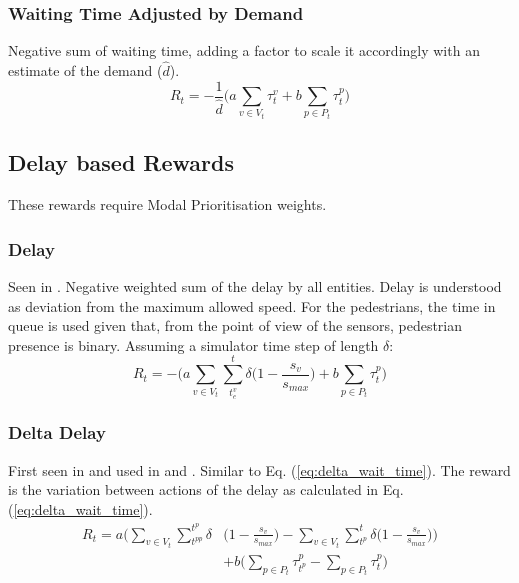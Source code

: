 \documentclass[sigconf,anonymous]{aamas}
\begin{document}
\subsubsection{Waiting Time Adjusted by Demand}
Negative sum of waiting time, adding a factor to scale it accordingly with an estimate of the demand ($\hat{d}$).
\begin{equation}
   R_t = -\frac{1}{\hat{d}} \bigg( a \sum_{v \in V_t} \tau^v_{t} + b \sum_{p \in P_t} \tau^p_{t} \bigg)
\label{eq:wait_time_norm} 
\end{equation}

\subsection{Delay based Rewards}
These rewards require Modal Prioritisation weights.
\subsubsection{Delay}
Seen in \cite{wan2018}. Negative weighted sum of the delay by all entities. Delay is understood as deviation from the maximum allowed speed. 
For the pedestrians, the time in queue is used given that, from the point of view of the sensors, pedestrian presence is binary.
Assuming a simulator time step of length $\delta$:
\begin{equation}
    R_t = - \bigg( a \sum_{v \in V_t}  \sum_{t^v_e}^t \delta \big( 1-\frac{s_v}{s_{max}} \big) + b \sum_{p \in P_t} \tau^p_t \bigg)
\label{eq:delay}
\end{equation}

\subsubsection{Delta Delay}
First seen in \cite{abdulhai2010} and used in \cite{mannion} \cite{genders2016} \cite{gao2017} \cite{mousavi2017} and \cite{gendersstate}.
Similar to Eq. (\ref{eq:delta_wait_time}).
The reward is the variation between actions of the delay as calculated in Eq. (\ref{eq:delta_wait_time}).
\begin{equation}
\begin{split}
R_t =  a \bigg( \sum_{v \in V_t} \sum_{t^{pp}}^{t^p} \delta & \big( 1-\frac{s_v}{s_{max}} \big) - \sum_{v \in V_t}  \sum_{t^p}^t \delta \big( 1-\frac{s_v}{s_{max}} \big) \bigg) \\
& + b \bigg( \sum_{p \in P_t} \tau^p_{t^p} - \sum_{p \in P_t} \tau^p_{t} \bigg) 
\end{split}
\label{eq:changedelay} 
\end{equation}
\end{document}
